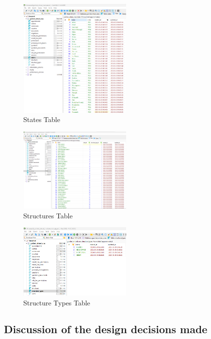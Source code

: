 \begin{figure}[H]
    \centering
    \includegraphics*[width=0.5\textwidth]{SCREENSHOTS/states.png}
    \caption{States Table}
    \label{fig:states-table}
\end{figure}

\begin{figure}[H]
    \centering
    \includegraphics*[width=0.5\textwidth]{SCREENSHOTS/structures.png}
    \caption{Structures Table}
    \label{fig:structures-table}
\end{figure}

\begin{figure}[H]
    \centering
    \includegraphics*[width=0.5\textwidth]{SCREENSHOTS/structuretypes.png}
    \caption{Structure Types Table}
    \label{fig:structures-types-table}
\end{figure}

\subsection{Discussion of the design decisions made}

